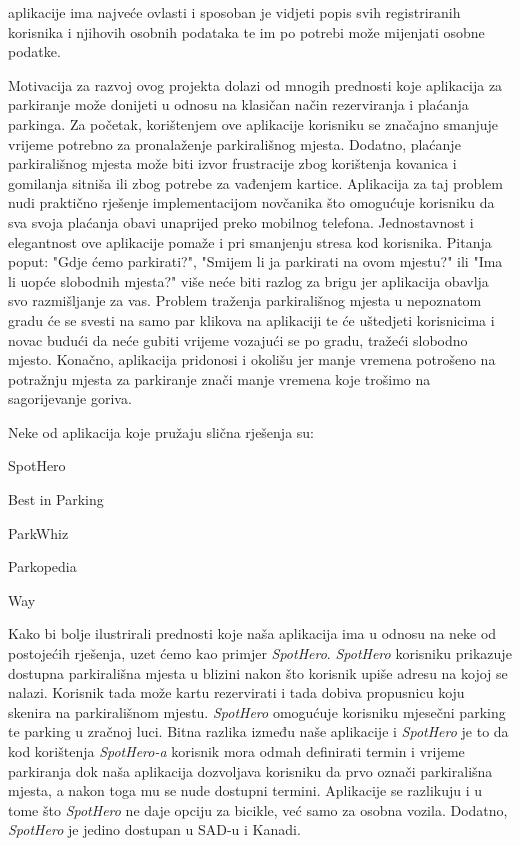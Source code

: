 		
		 aplikacije ima najveće ovlasti i sposoban je vidjeti popis svih registriranih korisnika i njihovih osobnih podataka te im po potrebi može mijenjati osobne podatke.
		
		Motivacija za razvoj ovog projekta dolazi od mnogih prednosti koje aplikacija za parkiranje može donijeti u odnosu na klasičan način rezerviranja i plaćanja parkinga. Za početak, korištenjem ove aplikacije korisniku se značajno smanjuje vrijeme potrebno za pronalaženje parkirališnog mjesta. Dodatno, plaćanje parkirališnog mjesta može biti izvor frustracije zbog korištenja kovanica i gomilanja sitniša ili zbog potrebe za vađenjem kartice. Aplikacija za taj problem nudi praktično rješenje implementacijom novčanika što omogućuje korisniku da sva svoja plaćanja obavi unaprijed preko mobilnog telefona. Jednostavnost i elegantnost ove aplikacije pomaže i pri smanjenju stresa kod korisnika. Pitanja poput: "Gdje ćemo parkirati?", "Smijem li ja parkirati na ovom mjestu?" ili "Ima li uopće slobodnih mjesta?" više neće biti razlog za brigu jer aplikacija obavlja svo razmišljanje za vas. Problem traženja parkirališnog mjesta u nepoznatom gradu će se svesti na samo par klikova na aplikaciji te će uštedjeti korisnicima i novac budući da neće gubiti vrijeme vozajući se po gradu, tražeći slobodno mjesto. Konačno, aplikacija pridonosi i okolišu jer manje vremena potrošeno na potražnju mjesta za parkiranje znači manje vremena koje trošimo na sagorijevanje goriva.
		
		Neke od aplikacija koje pružaju slična rješenja su:
		\begin{packed_item}
			\item SpotHero
			\item Best in Parking
			\item ParkWhiz
			\item Parkopedia
			\item Way
		\end{packed_item}
		
		Kako bi bolje ilustrirali prednosti koje naša aplikacija ima u odnosu na neke od postojećih rješenja, uzet ćemo kao primjer \textit {SpotHero}. \textit {SpotHero} korisniku prikazuje dostupna parkirališna mjesta u blizini nakon što korisnik upiše adresu na kojoj se nalazi. Korisnik tada može kartu rezervirati i tada dobiva propusnicu koju skenira na parkirališnom mjestu. \textit {SpotHero} omogućuje korisniku mjesečni parking te parking u zračnoj luci. Bitna razlika između naše aplikacije i \textit {SpotHero} je to da kod korištenja \textit {SpotHero-a} korisnik mora odmah definirati termin i vrijeme parkiranja dok naša aplikacija dozvoljava korisniku da prvo označi parkirališna mjesta, a nakon toga mu se nude dostupni termini. Aplikacije se razlikuju i u tome što \textit {SpotHero} ne daje opciju za bicikle, već samo za osobna vozila. Dodatno, \textit {SpotHero} je jedino dostupan u SAD-u i Kanadi.
		
